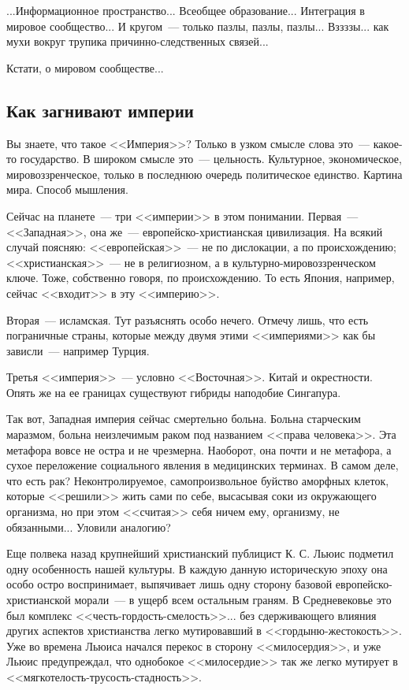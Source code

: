 \documentclass{scrbook}
\newcommand{\flqq}{<<}
\newcommand{\frqq}{>>}
\newcommand{\mdash}{~--- }
\newcommand{\essaysection}[1]{\subsection*{#1}\nopagebreak}
\begin{document}
...Информационное пространство... Всеобщее образование... Интеграция в мировое сообщество... И кругом{\mdash}только пазлы, пазлы, пазлы... Вззззы... как мухи вокруг трупика причинно-следственных связей...

Кстати, о мировом сообществе...

\essaysection{Как загнивают империи}

Вы знаете, что такое {\flqq}Империя{\frqq}? Только в узком смысле слова это{\mdash}какое-то государство. В широком смысле это{\mdash}цельность. Культурное, экономическое, мировоззренческое, только в последнюю очередь политическое единство. Картина мира. Способ мышления.

Сейчас на планете{\mdash}три {\flqq}империи{\frqq} в этом понимании. Первая{\mdash}{\flqq}Западная{\frqq}, она же{\mdash}европейско-христианская цивилизация. На всякий случай поясняю: {\flqq}европейская{\frqq}{\mdash}не по дислокации, а по происхождению; {\flqq}христианская{\frqq}{\mdash}не в религиозном, а в культурно-мировоззренческом ключе. Тоже, собственно говоря, по происхождению. То есть Япония, например, сейчас {\flqq}входит{\frqq} в эту {\flqq}империю{\frqq}.

Вторая{\mdash}исламская. Тут разъяснять особо нечего. Отмечу лишь, что есть пограничные страны, которые между двумя этими {\flqq}империями{\frqq} как бы зависли{\mdash}например Турция.

Третья {\flqq}империя{\frqq}{\mdash}условно {\flqq}Восточная{\frqq}. Китай и окрестности. Опять же на ее границах существуют гибриды наподобие Сингапура.

Так вот, Западная империя сейчас смертельно больна. Больна старческим маразмом, больна неизлечимым раком под названием {\flqq}права человека{\frqq}. Эта метафора вовсе не остра и не чрезмерна. Наоборот, она почти и не метафора, а сухое переложение социального явления в медицинских терминах. В самом деле, что есть рак? Неконтролируемое, самопроизвольное буйство аморфных клеток, которые {\flqq}решили{\frqq} жить сами по себе, высасывая соки из окружающего организма, но при этом {\flqq}считая{\frqq} себя ничем ему, организму, не обязанными... Уловили аналогию?

Еще полвека назад крупнейший христианский публицист К. С. Льюис подметил одну особенность нашей культуры. В каждую данную историческую эпоху она особо остро воспринимает, выпячивает лишь одну сторону базовой европейско-христианской морали{\mdash}в ущерб всем остальным граням. В Средневековье это был комплекс {\flqq}честь-гордость-смелость{\frqq}... без сдерживающего влияния других аспектов христианства легко мутировавший в {\flqq}гордыню-жестокость{\frqq}. Уже во времена Льюиса начался перекос в сторону {\flqq}милосердия{\frqq}, и уже Льюис предупреждал, что однобокое {\flqq}милосердие{\frqq} так же легко мутирует в {\flqq}мягкотелость-трусость-стадность{\frqq}.
\end{document}
